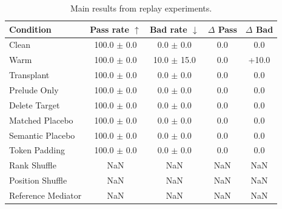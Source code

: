 \begin{table}[t]
\centering\small\setlength{\tabcolsep}{4pt}
\begin{tabular}{lcccc}
\toprule
Condition & Pass rate $\uparrow$ & Bad rate $\downarrow$ & $\Delta$ Pass & $\Delta$ Bad \\
\midrule
Clean & 100.0 $\pm$ 0.0 & 0.0 $\pm$ 0.0 & 0.0 & 0.0 \\
Warm & 100.0 $\pm$ 0.0 & 10.0 $\pm$ 15.0 & 0.0 & +10.0 \\
Transplant & 100.0 $\pm$ 0.0 & 0.0 $\pm$ 0.0 & 0.0 & 0.0 \\
Prelude Only & 100.0 $\pm$ 0.0 & 0.0 $\pm$ 0.0 & 0.0 & 0.0 \\
Delete Target & 100.0 $\pm$ 0.0 & 0.0 $\pm$ 0.0 & 0.0 & 0.0 \\
Matched Placebo & 100.0 $\pm$ 0.0 & 0.0 $\pm$ 0.0 & 0.0 & 0.0 \\
Semantic Placebo & 100.0 $\pm$ 0.0 & 0.0 $\pm$ 0.0 & 0.0 & 0.0 \\
Token Padding & 100.0 $\pm$ 0.0 & 0.0 $\pm$ 0.0 & 0.0 & 0.0 \\
Rank Shuffle & NaN & NaN & NaN & NaN \\
Position Shuffle & NaN & NaN & NaN & NaN \\
Reference Mediator & NaN & NaN & NaN & NaN \\
\bottomrule
\end{tabular}
\caption{Main results from replay experiments.}
\label{tab:main}
\end{table}